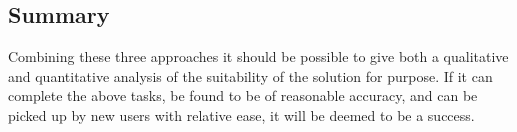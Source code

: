 \documentclass[a4paper,10pt]{article}
\begin{document}
\subsection{Summary}
Combining these three approaches it should be possible to give both a qualitative and quantitative analysis of the suitability of the solution for purpose. If it can complete the above tasks, be found to be of reasonable accuracy, and can be picked up by new users with relative ease, it will be deemed to be a success. 

\clearpage
\renewcommand*{\refname}{\section{References}}


\end{document}
